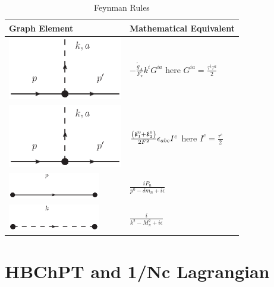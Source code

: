 \documentclass{article}
\begin{document}
\begin{table}
	[ht] \caption{Feynman Rules} 
	\vspace{5mm}
	\begin{tabular}{ M{5.5cm} M{5.5cm}}
		\hline 
		Graph Element & Mathematical Equivalent \\
		\hline 
		\includegraphics[trim={7cm 23cm 7cm 2cm}, clip=true,width= 		 5cm]{images/single_pion_vertex.eps} & $ -\frac{\mathring{g}_{A}}{F_{\pi}}  k^{i}G^{ia}$ here  $G^{ia}=\frac{\tau^i \tau^a}{2}$ \\ %
		\includegraphics[trim={7cm 23cm 7cm 2cm}, clip=true,width=
		5cm]{images/single_pion_vertex.eps} & $ \frac{\left(\slashed k^0_1 +\slashed k^0_2 \right)}{2F^2}  \epsilon_{abc}  I^{c}$ here  $I^{c}=\frac{\tau^c}{2}$  \\ %
		\includegraphics[trim={7cm 23cm 7cm 2cm}, clip=true,width= 4cm]{images/baryon_propagator.eps} & $ \frac{iP_{n}}{p^{0}- \delta m_{n}+ i \epsilon} $ \\
		\includegraphics[trim={7cm 23cm 7cm 2cm}, clip=true,width= 4cm]{images/meson_propargator.eps} & $ \frac{i}{k^{2}-M_{\pi}^{2}  +i\epsilon} $ \\
		\hline
	\end{tabular}
\end{table}


\newpage
\section{HBChPT and 1/Nc Lagrangian}
\end{document}
